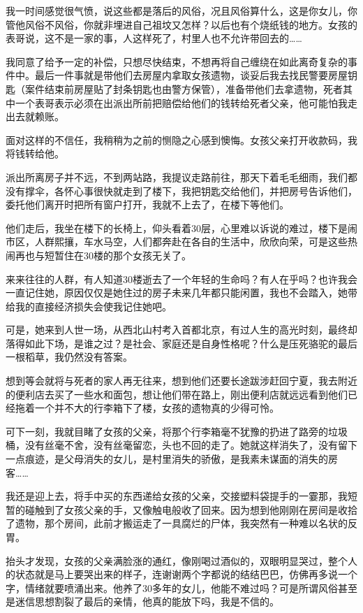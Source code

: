 我一时间感觉很气愤，说这些都是落后的风俗，况且风俗算什么，这是你女儿，你管他风俗不风俗，你就非埋进自己祖坟又怎样？以后也有个烧纸钱的地方。女孩的表哥说，这不是一家的事，人这样死了，村里人也不允许带回去的……

我同意了给予一定的补偿，只想尽快结束，不想再将自己缠绕在如此离奇复杂的事件中。最后一件事就是带他们去房屋内拿取女孩遗物，谈妥后我去找民警要房屋钥匙（案件结束前房屋贴了封条钥匙也由警方保管），准备带他们去拿遗物，死者其中一个表哥表示必须在出派出所前把赔偿给他们的钱转给死者父亲，他可能怕我走出去就赖账。

面对这样的不信任，我稍稍为之前的恻隐之心感到懊悔。女孩父亲打开收款码，我将钱转给他。

派出所离房子并不远，不到两站路，我提议走路前往，那天下着毛毛细雨，我们都没有撑伞，各怀心事很快就走到了楼下，我把钥匙交给他们，并把房号告诉他们，委托他们离开时把所有窗户打开，我就不上去了，在楼下等他们。

他们走后，我坐在楼下的长椅上，仰头看着30层，心里难以诉说的难过，楼下是闹市区，人群熙攘，车水马空，人们都奔赴在各自的生活中，欣欣向荣，可是这些热闹再也与短暂住在30楼的那个女孩无关了。

来来往往的人群，有人知道30楼逝去了一个年轻的生命吗？有人在乎吗？也许我会一直记住她，原因仅仅是她住过的房子未来几年都只能闲置，我也不会踏入，她带给我的直接经济损失会使我记住她吧。

可是，她来到人世一场，从西北山村考入首都北京，有过人生的高光时刻，最终却落得如此下场，是谁之过？是社会、家庭还是自身性格呢？什么是压死骆驼的最后一根稻草，我仍然没有答案。

想到等会就将与死者的家人再无往来，想到他们还要长途跋涉赶回宁夏，我去附近的便利店去买了一些水和面包，想让他们带在路上，刚出便利店就远远看到他们已经拖着一个并不大的行李箱下了楼，女孩的遗物真的少得可怜。

可下一刻，我就目睹了女孩的父亲，将那个行李箱毫不犹豫的扔进了路旁的垃圾桶，没有丝毫不舍，没有丝毫留恋，头也不回的走了。她就这样消失了，没有留下一点痕迹，是父母消失的女儿，是村里消失的骄傲，是我素未谋面的消失的房客……

我还是迎上去，将手中买的东西递给女孩的父亲，交接塑料袋提手的一霎那，我短暂的碰触到了女孩父亲的手，又像触电般收了回来。因为想到他刚刚在房间是收拾了遗物，那个房间，此前才搬运走了一具腐烂的尸体，我突然有一种难以名状的反胃。

抬头才发现，女孩的父亲满脸涨的通红，像刚喝过酒似的，双眼明显哭过，整个人的状态就是马上要哭出来的样子，连谢谢两个字都说的结结巴巴，仿佛再多说一个字，情绪就要喷涌出来。他养了30多年的女儿，他能不难过吗？可是所谓风俗甚至是迷信思想割裂了最后的亲情，他真的能放下吗，我是不信的。

